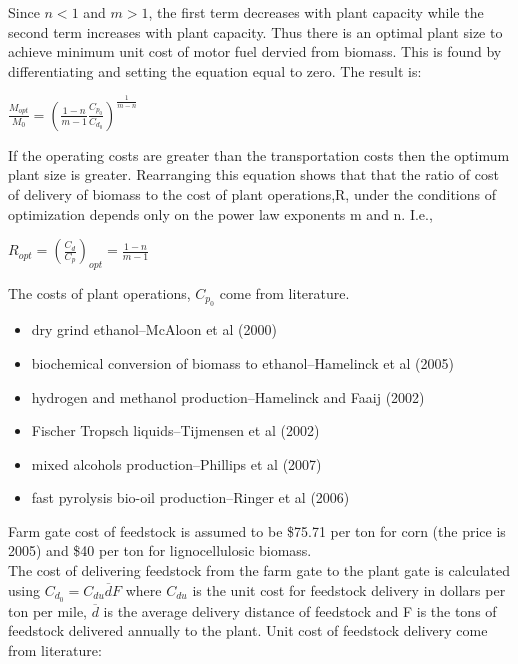 \documentclass{article}\usepackage[]{graphicx}\usepackage[]{color}
\begin{document}
Since $n<1$ and $m>1$, the first term decreases with plant capacity while the second term increases with plant capacity.  Thus there is an optimal plant size to achieve minimum unit cost of motor fuel dervied from biomass.  This is found by differentiating and setting the equation equal to zero.  The result is:

\begin{centering}
$\frac{M_{opt}}{M_0} = (\frac{1-n}{m-1}\frac{C_{p_0}}{C_{d_0}})^{\frac{1}{m-n}}$
\end{centering}

If the operating costs are greater than the transportation costs then the optimum plant size is greater.  Rearranging this equation shows that that the ratio of cost of delivery of biomass to the cost of plant operations,R, under the conditions of optimization depends only on the power law exponents m and n.  I.e.,

\begin{centering}
$R_{opt}=(\frac{C_d}{C_p})_{opt} = \frac{1-n}{m-1}$
\end{centering}

The costs of plant operations, $C_{p_0}$ come from literature. \\

\begin{itemize}
\item dry grind ethanol--McAloon et al (2000)
\item biochemical conversion of biomass to ethanol--Hamelinck et al (2005)
\item hydrogen and methanol production--Hamelinck and Faaij (2002)
\item Fischer Tropsch liquids--Tijmensen et al (2002)
\item mixed alcohols production--Phillips et al (2007)
\item fast pyrolysis bio-oil production--Ringer et al (2006)
\end{itemize}

Farm gate cost of feedstock is assumed to be \$75.71 per ton for corn (the price is 2005) and \$40 per ton for lignocellulosic biomass. \\

The cost of delivering feedstock from the farm gate to the plant gate is calculated using $C_{d_0} = C_{du} \overline{d} F$ where $C_{du}$ is the unit cost for feedstock delivery in dollars per ton per mile, $\overline{d}$ is the average delivery distance of feedstock and F is the tons of feedstock delivered annually to the plant.  Unit cost of feedstock delivery come from literature: \\
\end{document}
